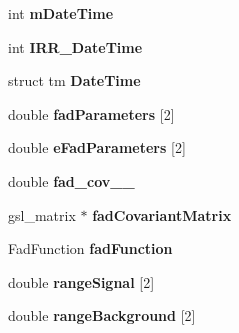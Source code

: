 \begin{DoxyCompactItemize}
\item 
\hypertarget{classData_aa4febdde96d28f7740a30e0c2f58eff5}{int {\bfseries m\-Date\-Time}}\label{classData_aa4febdde96d28f7740a30e0c2f58eff5}

\item 
\hypertarget{classData_abf03ecd8788f1086e68bc33baf776c45}{int {\bfseries I\-R\-R\-\_\-\-Date\-Time}}\label{classData_abf03ecd8788f1086e68bc33baf776c45}

\item 
\hypertarget{classData_a96bec838c423f73e8c5a4ae71754d549}{struct tm {\bfseries Date\-Time}}\label{classData_a96bec838c423f73e8c5a4ae71754d549}

\item 
\hypertarget{classData_a8c2c5be33ab9680c7c3983e9e858b268}{double {\bfseries fad\-Parameters} \mbox{[}2\mbox{]}}\label{classData_a8c2c5be33ab9680c7c3983e9e858b268}

\item 
\hypertarget{classData_a6760cf2282a9a70bbf7e66e19479f4d9}{double {\bfseries e\-Fad\-Parameters} \mbox{[}2\mbox{]}}\label{classData_a6760cf2282a9a70bbf7e66e19479f4d9}

\item 
\hypertarget{classData_a6bcd68557e3ba799ade06fd96398b488}{double {\bfseries fad\-\_\-cov\-\_\-\_}}\label{classData_a6bcd68557e3ba799ade06fd96398b488}

\item 
\hypertarget{classData_a7fffccb3ce17db148bd32f868fec2aec}{gsl\-\_\-matrix $\ast$ {\bfseries fad\-Covariant\-Matrix}}\label{classData_a7fffccb3ce17db148bd32f868fec2aec}

\item 
\hypertarget{classData_abace911f0a2709d788bfce3be443c805}{Fad\-Function {\bfseries fad\-Function}}\label{classData_abace911f0a2709d788bfce3be443c805}

\item 
\hypertarget{classData_a0a2e114f10d5cba36a37c7bf15fa1ffb}{double {\bfseries range\-Signal} \mbox{[}2\mbox{]}}\label{classData_a0a2e114f10d5cba36a37c7bf15fa1ffb}

\item 
\hypertarget{classData_a9d770d30613f58eb573ac53524844538}{double {\bfseries range\-Background} \mbox{[}2\mbox{]}}\label{classData_a9d770d30613f58eb573ac53524844538}

\end{DoxyCompactItemize}
